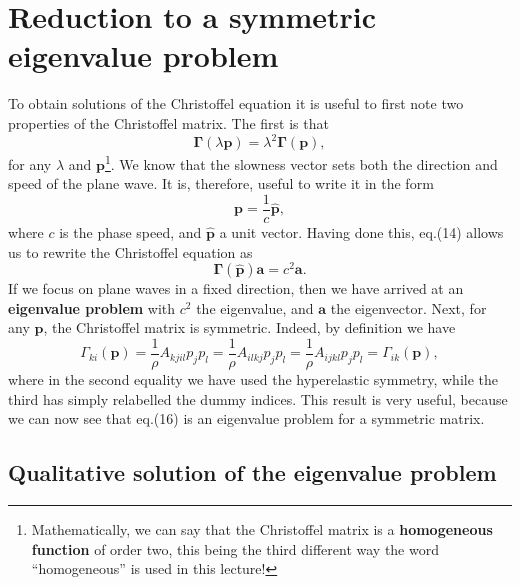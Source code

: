 \documentclass [a4paper,12pt]{paper}
\begin{document}
\section*{Reduction to a symmetric eigenvalue problem}

To obtain solutions of the Christoffel equation it is useful to first note two properties of the Christoffel matrix. The first is that
\begin{equation}
\bm{\Gamma}(\lambda \mathbf{p})=\lambda^{2}\bm{\Gamma}(\mathbf{p}),
\end{equation}
for any $\lambda$ and $\mathbf{p}$\footnote{Mathematically, we can say that the Christoffel matrix is a \textbf{homogeneous function} of order two, 
this being the third different way the word ``homogeneous'' is used in this lecture!}. We know that the slowness vector sets both the direction and speed of the plane wave. It is, therefore, useful to write it in the form
\begin{equation}
\mathbf{p}=\frac{1}{c}\hat{\mathbf{p}}, 
\end{equation}
where $c$ is the phase speed, and $\hat{\mathbf{p}}$ a unit vector. Having done this, eq.(14) allows us to rewrite the Christoffel equation as
\begin{equation}
\bm{\Gamma}(\hat{\mathbf{p}})\mathbf{a}=c^{2}\mathbf{a}.
\end{equation}
If we focus on plane waves in a fixed direction, then we have arrived at an \textbf{eigenvalue problem} with $c^{2}$ the eigenvalue, 
and $\mathbf{a}$ the eigenvector. Next, for any $\mathbf{p}$, the Christoffel matrix is symmetric. Indeed, by definition we have
\begin{equation}
\Gamma_{ki}(\mathbf{p})=\frac{1}{\rho}A_{kjil}p_{j}p_{l}=\frac{1}{\rho}A_{ilkj}p_{j}p_{l}=\frac{1}{\rho}A_{ijkl}p_{j}p_{l}=\Gamma_{ik}(\mathbf{p}),
\end{equation}
where in the second equality we have used the hyperelastic symmetry, while the third has simply relabelled the dummy indices. 
This result is very useful, because we can now see that eq.(16) is an eigenvalue problem for a symmetric matrix.

\subsection*{Qualitative solution of the eigenvalue problem}
\end{document}
